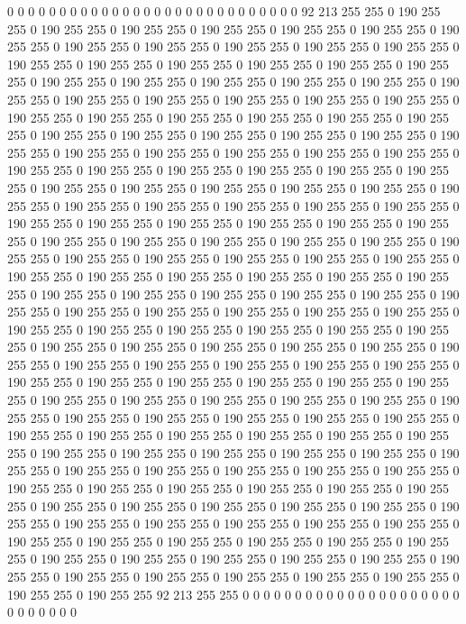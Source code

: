 0 0 0 0 0 0 0 0 0 0 0 0 0 0 0 0 0 0 0 0 0 0 0 0 0 0 0 0 92 213 255 255 0 190 255 255 0 190 255 255 0 190 255 255 0 190 255 255 0 190 255 255 0 190 255 255 0 190 255 255 0 190 255 255 0 190 255 255 0 190 255 255 0 190 255 255 0 190 255 255 0 190 255 255 0 190 255 255 0 190 255 255 0 190 255 255 0 190 255 255 0 190 255 255 0 190 255 255 0 190 255 255 0 190 255 255 0 190 255 255 0 190 255 255 0 190 255 255 0 190 255 255 0 190 255 255 0 190 255 255 0 190 255 255 0 190 255 255 0 190 255 255 0 190 255 255 0 190 255 255 0 190 255 255 0 190 255 255 0 190 255 255 0 190 255 255 0 190 255 255 0 190 255 255 0 190 255 255 0 190 255 255 0 190 255 255 0 190 255 255 
0 190 255 255 0 190 255 255 0 190 255 255 0 190 255 255 0 190 255 255 0 190 255 255 0 190 255 255 0 190 255 255 0 190 255 255 0 190 255 255 0 190 255 255 0 190 255 255 0 190 255 255 0 190 255 255 0 190 255 255 0 190 255 255 0 190 255 255 0 190 255 255 0 190 255 255 0 190 255 255 0 190 255 255 0 190 255 255 0 190 255 255 0 190 255 255 0 190 255 255 0 190 255 255 0 190 255 255 0 190 255 255 0 190 255 255 0 190 255 255 0 190 255 255 0 190 255 255 0 190 255 255 0 190 255 255 0 190 255 255 0 190 255 255 0 190 255 255 0 190 255 255 0 190 255 255 0 190 255 255 0 190 255 255 0 190 255 255 0 190 255 255 0 190 255 255 0 190 255 255 0 190 255 255 0 190 255 255 0 190 255 255 0 190 255 255 0 190 255 255 
0 190 255 255 0 190 255 255 0 190 255 255 0 190 255 255 0 190 255 255 0 190 255 255 0 190 255 255 0 190 255 255 0 190 255 255 0 190 255 255 0 190 255 255 0 190 255 255 0 190 255 255 0 190 255 255 0 190 255 255 0 190 255 255 0 190 255 255 0 190 255 255 0 190 255 255 0 190 255 255 0 190 255 255 0 190 255 255 0 190 255 255 0 190 255 255 0 190 255 255 0 190 255 255 0 190 255 255 0 190 255 255 0 190 255 255 0 190 255 255 0 190 255 255 0 190 255 255 0 190 255 255 0 190 255 255 0 190 255 255 0 190 255 255 0 190 255 255 0 190 255 255 0 190 255 255 0 190 255 255 0 190 255 255 0 190 255 255 0 190 255 255 0 190 255 255 0 190 255 255 0 190 255 255 0 190 255 255 0 190 255 255 0 190 255 255 0 190 255 255 
0 190 255 255 0 190 255 255 0 190 255 255 0 190 255 255 0 190 255 255 0 190 255 255 0 190 255 255 0 190 255 255 0 190 255 255 0 190 255 255 0 190 255 255 0 190 255 255 0 190 255 255 0 190 255 255 0 190 255 255 0 190 255 255 0 190 255 255 0 190 255 255 0 190 255 255 0 190 255 255 0 190 255 255 0 190 255 255 0 190 255 255 0 190 255 255 0 190 255 255 0 190 255 255 0 190 255 255 0 190 255 255 0 190 255 255 0 190 255 255 0 190 255 255 0 190 255 255 0 190 255 255 0 190 255 255 0 190 255 255 0 190 255 255 0 190 255 255 0 190 255 255 0 190 255 255 0 190 255 255 0 190 255 255 0 190 255 255 92 213 255 255 0 0 0 0 0 0 0 0 0 0 0 0 0 0 0 0 0 0 0 0 0 0 0 0 0 0 0 0 
